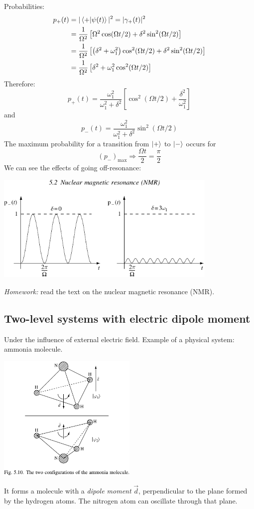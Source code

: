 \documentclass[12pt]{article}
\newcommand{\be}{\begin{equation}}
\newcommand{\ee}{\end{equation}}
\begin{document}
Probabilities:
\[
\begin{aligned}
p_+(t) 
&= |\bra{+}\ket{\psi(t)}|^2 = |\gamma_+(t)|^2\\
&=\frac{1}{\Omega^{2}}\left[\Omega^{2} \cos (\Omega t / 2)+\delta^{2} \sin ^{2}(\Omega t / 2)\right]\\
&=\frac{1}{\Omega^{2}}\left[\left(\delta^{2}+\omega_{1}^{2}\right) \cos ^{2}(\Omega t / 2)+\delta^{2} \sin ^{2}(\Omega t / 2)\right]\\
&=\frac{1}{\Omega^{2}}\left[\delta^{2}+\omega_{1}^{2} \cos ^{2}(\Omega t / 2)\right]
\end{aligned}
\]
Therefore:
\be
p_{+}(t)=\frac{\omega_{1}^{2}}{\omega_{1}^{2}+\delta^{2}}\left[\cos ^{2}(\Omega t / 2)+\frac{\delta^{2}}{\omega_{1}^{2}}\right]
\ee
and
\be
p_{-}(t)=\frac{\omega_{1}^{2}}{\omega_{1}^{2}+\delta^{2}} \sin ^{2}(\Omega t / 2)
\ee
The maximum probability for a transition
from $\ket{+}$ to $\ket{-}$ occurs for
\be
\left(p_{-}\right)_{\max} \Rightarrow 
\frac{\Omega t}{2} = \frac{\pi}{2}
\ee
We can see the effects of going off-resonance:
\begin{center}
\includegraphics[width=0.8\textwidth]{Figures/RabiOscillations.pdf}
\end{center}

\emph{Homework:} read the text on the nuclear magnetic resonance (NMR).

\clearpage


\subsection{Two-level systems with electric dipole moment}

Under the influence of external electric field.
Example of a physical system: ammonia molecule.
\begin{center}
\includegraphics[width=0.5\textwidth]{Figures/ammoniaMolecule.pdf}
\end{center}
It forms a molecule with a \emph{dipole moment} $\vec{d}$,
perpendicular to the plane formed by the hydrogen atoms. The nitrogen atom can oscillate through that plane.
\end{document}
